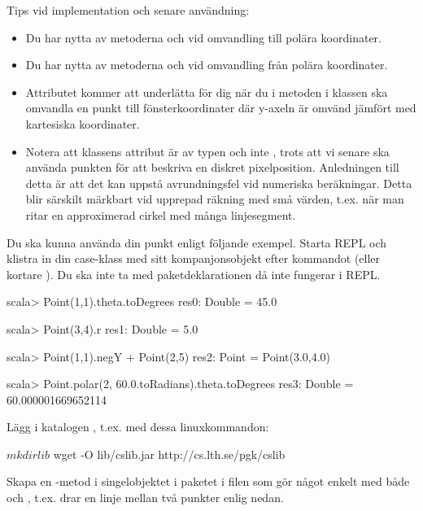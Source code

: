\noindent Tips vid implementation och senare användning:
\begin{itemize}
\item Du har nytta av metoderna  och  vid omvandling till polära koordinater.

\item Du har nytta av metoderna  och  vid omvandling från polära koordinater.

\item Attributet  kommer att underlätta för dig när du i metoden  i klassen  ska omvandla en punkt till fönsterkoordinater där y-axeln är omvänd jämfört med kartesiska koordinater.

\item Notera att klassens attribut är av typen  och inte , trots att vi senare ska använda punkten för att beskriva en diskret pixelposition. Anledningen till detta är att det kan uppstå avrundningsfel vid numeriska beräkningar. Detta blir särskilt märkbart vid upprepad räkning med små värden, t.ex. när man ritar en approximerad cirkel med många linjesegment.
\end{itemize}

\noindent Du ska kunna använda din punkt enligt följande exempel. Starta REPL och klistra in din case-klass med sitt kompanjonsobjekt efter kommandot  (eller kortare ). Du ska inte ta med paketdeklarationen då  inte fungerar i REPL.
\begin{REPLnonum}
scala> Point(1,1).theta.toDegrees
res0: Double = 45.0

scala> Point(3,4).r
res1: Double = 5.0

scala> Point(1,1).negY + Point(2,5)
res2: Point = Point(3.0,4.0)

scala> Point.polar(2, 60.0.toRadians).theta.toDegrees
res3: Double = 60.000001669652114
\end{REPLnonum}


\Task Lägg  i katalogen , t.ex. med dessa linuxkommandon:
\begin{REPLnonum}
$ mkdir lib
$ wget -O lib/cslib.jar http://cs.lth.se/pgk/cslib
\end{REPLnonum}

\Task Skapa en -metod i singelobjektet  i paketet  i filen  som gör något enkelt med både  och , t.ex. drar en linje mellan två punkter enlig nedan. 

